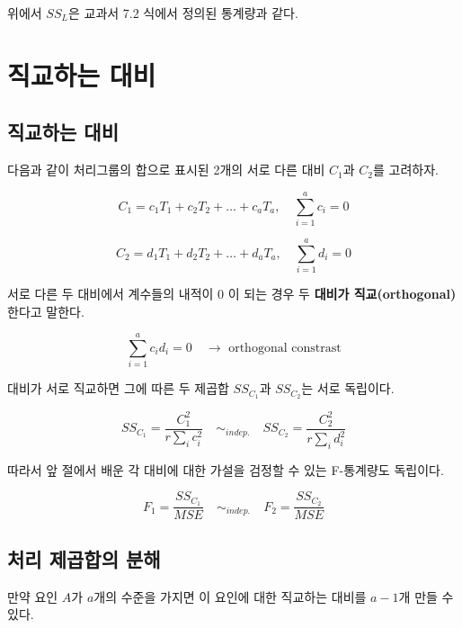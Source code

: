 \documentclass[
]{book}
\begin{document}
위에서 \(SS_L\)은 교과서 7.2 식에서 정의된 통계량과 같다.

\hypertarget{orthogonal}{%
\chapter{직교하는 대비}\label{orthogonal}}

\hypertarget{uxc9c1uxad50uxd558uxb294-uxb300uxbe44}{%
\section{직교하는 대비}\label{uxc9c1uxad50uxd558uxb294-uxb300uxbe44}}

다음과 같이 처리그룹의 합으로 표시된 2개의 서로 다른 대비 \(C_1\)과 \(C_2\)를 고려하자.

\begin{equation}
C_1 = c_1 T_1 + c_2 T_2 + \dots + c_a T_a, \quad \sum_{i=1}^a c_i =0
\label{eq:contrast1}
\end{equation}

\begin{equation}
C_2 = d_1 T_1 + d_2 T_2 + \dots + d_a T_a, \quad \sum_{i=1}^a d_i =0
\label{eq:contrast2}
\end{equation}

서로 다른 두 대비에서 계수들의 내적이 0 이 되는 경우 두 \textbf{대비가 직교(orthogonal)}한다고 말한다.

\begin{equation}
 \sum_{i=1}^a c_i d_i =0 \quad \rightarrow \text{ orthogonal constrast}
\label{eq:ortho}
\end{equation}

대비가 서로 직교하면 그에 따른 두 제곱합 \(SS_{C_1}\)과 \(SS_{C_2}\)는 서로 독립이다.

\[ SS_{C_1} = \frac{C_1^2}{r\sum_i c_i^2 } \quad \sim_{indep.} \quad SS_{C_2} = \frac{C_2^2}{r\sum_i d_i^2 } \]

따라서 앞 절에서 배운 각 대비에 대한 가설을 검정할 수 있는 F-통계량도 독립이다.

\[ F_1 = \frac{SS_{C_1}}{MSE}  \quad \sim_{indep.} \quad F_2 = \frac{SS_{C_2}}{MSE} \]

\hypertarget{uxcc98uxb9ac-uxc81cuxacf1uxd569uxc758-uxbd84uxd574}{%
\section{처리 제곱합의 분해}\label{uxcc98uxb9ac-uxc81cuxacf1uxd569uxc758-uxbd84uxd574}}

만약 요인 \(A\)가 \(a\)개의 수준을 가지면 이 요인에 대한 직교하는 대비를 \(a-1\)개 만들 수 있다.
\end{document}
